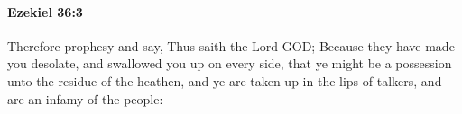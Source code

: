 
		\paragraph{Ezekiel 36:3} %
			\label{EZEKIEL-36-3}

			Therefore prophesy and say, Thus saith the Lord GOD; Because they have made you desolate, and swallowed you up on every side, that ye might be a possession unto the residue of the heathen, and ye are taken up in the lips of talkers, and are an infamy of the people:


